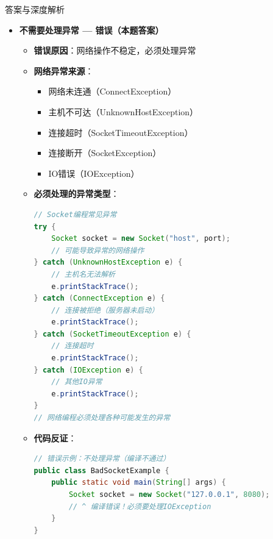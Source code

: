 \documentclass[12pt, a4paper]{ctexart}
\begin{document}
\begin{enumerate}[label=\textbf{\arabic*.}]
\begin{bluebox}{答案与深度解析}
\begin{itemize}[leftmargin=*, nosep, label={}]
			      \item[D] \textbf{不需要处理异常 — 错误（本题答案）}
			            \begin{itemize}[label={}, leftmargin=*, nosep]
				            \item \textbf{错误原因}：网络操作不稳定，必须处理异常
				            \item \textbf{网络异常来源}：
				                  \begin{itemize}[label={}, nosep]
					                  \item 网络未连通（ConnectException）
					                  \item 主机不可达（UnknownHostException）
					                  \item 连接超时（SocketTimeoutException）
					                  \item 连接断开（SocketException）
					                  \item IO错误（IOException）
				                  \end{itemize}
				            \item \textbf{必须处理的异常类型}：
				                  \begin{lstlisting}[language=Java]
// Socket编程常见异常
try {
    Socket socket = new Socket("host", port);
    // 可能导致异常的网络操作
} catch (UnknownHostException e) {
    // 主机名无法解析
    e.printStackTrace();
} catch (ConnectException e) {
    // 连接被拒绝（服务器未启动）
    e.printStackTrace();
} catch (SocketTimeoutException e) {
    // 连接超时
    e.printStackTrace();
} catch (IOException e) {
    // 其他IO异常
    e.printStackTrace();
}
// 网络编程必须处理各种可能发生的异常
					      \end{lstlisting}
				            \item \textbf{代码反证}：
				                  \begin{lstlisting}[language=Java]
// 错误示例：不处理异常（编译不通过）
public class BadSocketExample {
    public static void main(String[] args) {
        Socket socket = new Socket("127.0.0.1", 8080);
        // ^ 编译错误！必须要处理IOException
    }
}


\end{lstlisting}
\end{itemize}
\end{itemize}
\end{bluebox}
\end{enumerate}
\end{document}
